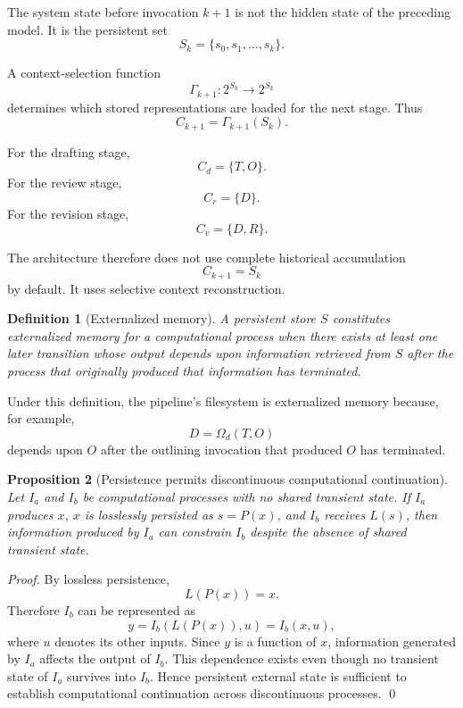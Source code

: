 \documentclass[11pt]{article}
\newtheorem{definition}{Definition}[section]
\newtheorem{proposition}[definition]{Proposition}
\begin{document}
The system state before invocation \(k+1\) is not the hidden state of the preceding model. It is the persistent set
\[
    S_k
    =
    \{s_0,s_1,\ldots,s_k\}.
\]

A context-selection function
\[
    \Gamma_{k+1}:2^{S_k}\rightarrow 2^{S_k}
\]
determines which stored representations are loaded for the next stage. Thus
\[
    C_{k+1}
    =
    \Gamma_{k+1}(S_k).
\]

For the drafting stage,
\[
    C_d=\{T,O\}.
\]
For the review stage,
\[
    C_r=\{D\}.
\]
For the revision stage,
\[
    C_v=\{D,R\}.
\]

The architecture therefore does not use complete historical accumulation
\[
    C_{k+1}=S_k
\]
by default. It uses selective context reconstruction.

\begin{definition}[Externalized memory]
A persistent store \(S\) constitutes externalized memory for a computational process when there exists at least one later transition whose output depends upon information retrieved from \(S\) after the process that originally produced that information has terminated.
\end{definition}

Under this definition, the pipeline's filesystem is externalized memory because, for example,
\[
    D
    =
    \Omega_d(T,O)
\]
depends upon \(O\) after the outlining invocation that produced \(O\) has terminated.

\begin{proposition}[Persistence permits discontinuous computational continuation]
Let \(I_a\) and \(I_b\) be computational processes with no shared transient state. If \(I_a\) produces \(x\), \(x\) is losslessly persisted as \(s=P(x)\), and \(I_b\) receives \(L(s)\), then information produced by \(I_a\) can constrain \(I_b\) despite the absence of shared transient state.
\end{proposition}

\begin{proof}
By lossless persistence,
\[
    L(P(x))=x.
\]
Therefore \(I_b\) can be represented as
\[
    y=I_b(L(P(x)),u)
      =I_b(x,u),
\]
where \(u\) denotes its other inputs. Since \(y\) is a function of \(x\), information generated by \(I_a\) affects the output of \(I_b\). This dependence exists even though no transient state of \(I_a\) survives into \(I_b\). Hence persistent external state is sufficient to establish computational continuation across discontinuous processes. \qed
\end{proof}
\end{document}
